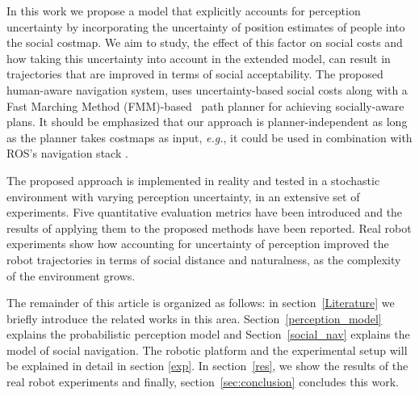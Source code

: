 In this work we propose a model that explicitly accounts for perception uncertainty by incorporating the uncertainty of position estimates of people into the social costmap. We aim to study, the effect of this factor on social costs and how taking this uncertainty into account in the extended model, can result in trajectories that are improved in terms of social acceptability. The proposed human-aware navigation system, uses uncertainty-based social costs along with a Fast Marching Method (FMM)-based~\cite{sethian1999fast} path planner for achieving socially-aware plans. It should be emphasized that our approach is planner-independent as long as the planner takes costmaps as input, \textit{e.g.}, it could be used in combination with ROS's navigation stack \cite{lu2014iros}. 


The proposed approach is implemented in reality and tested in a stochastic environment with varying perception uncertainty, in an extensive set of experiments. Five quantitative evaluation metrics have been introduced and the results of applying them to the proposed methods have been reported. Real robot experiments show how accounting for uncertainty of perception improved the robot trajectories in terms of social distance and naturalness, as the complexity of the environment grows.

The remainder of this article is organized as follows: in section~\ref{Literature} we briefly introduce the related works in this area. Section~\ref{perception_model} explains the probabilistic perception model and Section~\ref{social_nav} explains the model of social navigation. The robotic platform 
and the experimental setup will be explained in detail in section \ref{exp}. In section~\ref{res}, we show the results of the real robot experiments and finally, section~\ref{sec:conclusion} concludes this work.






